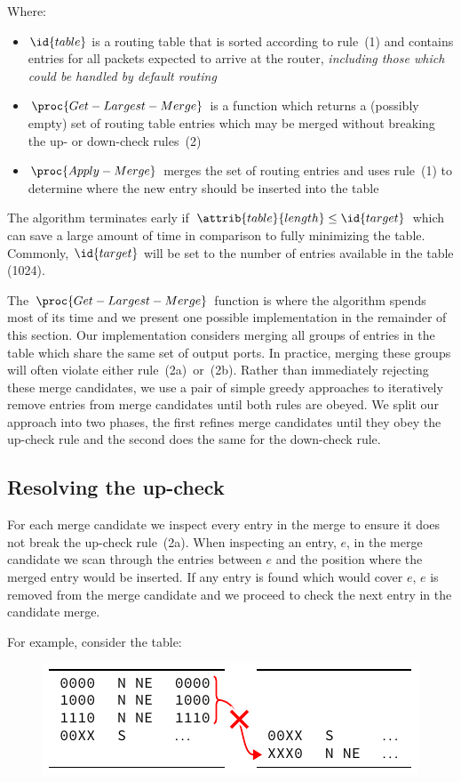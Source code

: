 \documentclass[conference]{IEEEtran}
\begin{document}
  \noindent Where:
  \begin{itemize}
    \item $\id{table}$ is a routing table that is sorted according to rule~(1) and contains entries for all packets expected to arrive at the router, \textit{including those which could be handled by default routing}
    \item $\proc{Get-Largest-Merge}$ is a function which returns a (possibly empty) set of routing table entries which may be merged without breaking the up- or down-check rules~(2)
    \item $\proc{Apply-Merge}$ merges the set of routing entries and uses rule~(1) to determine where the new entry should be inserted into the table
  \end{itemize}

  The algorithm terminates early if $\attrib{table}{length} \le \id{target}$ which can save a large amount of time in comparison to fully minimizing the table.
  Commonly, $\id{target}$ will be set to the number of entries available in the table (1024).

  The $\proc{Get-Largest-Merge}$ function is where the algorithm spends most of its time and we present one possible implementation in the remainder of this section.
  Our implementation considers merging all groups of entries in the table which share the same set of output ports.
  In practice, merging these groups will often violate either rule~(2a)~or~(2b).
  Rather than immediately rejecting these merge candidates, we use a pair of simple greedy approaches to iteratively remove entries from merge candidates until both rules are obeyed.
  We split our approach into two phases, the first refines merge candidates until they obey the up-check rule and the second does the same for the down-check rule.

  \subsection{Resolving the up-check}

  For each merge candidate we inspect every entry in the merge to ensure it does not break the up-check rule~(2a).
  When inspecting an entry, $e$, in the merge candidate we scan through the entries between $e$ and the position where the merged entry would be inserted.
  If any entry is found which would cover $e$, $e$ is removed from the merge candidate and we proceed to check the next entry in the candidate merge.

  For example, consider the table:\par\nopagebreak
  \begin{figure}[H]
    \centering
    \includegraphics{figures/upcheck_resolve_example_1}
  \end{figure}
\end{document}
